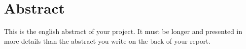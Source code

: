 \chapter*{Abstract}

This is the english abstract of your project. It must be longer and presented in more details than the abstract you write on the back of your report.
